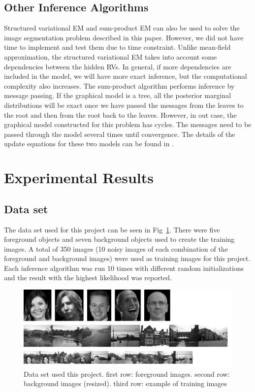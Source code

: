 \documentclass{article} %
\begin{document}
\subsection{Other Inference Algorithms}
Structured variational EM and sum-product EM can also be used to solve the image segmentation problem described in this paper. However, we did not have time to implement and test them due to time constraint. Unlike mean-field approximation, the structured variational EM takes into account some dependencies between the hidden RVs. In general, if more dependencies are included in the model, we will have more exact inference, but the computational complexity also increases. The sum-product algorithm performs inference by message passing. If the graphical model is a tree, all the posterior marginal distributions will be exact once we have passed the messages from the leaves to the root and then from the root back to the leaves. However, in out case, the graphical model constructed for this problem has cycles. The messages need to be passed through the model several times until convergence. The details of the update equations for these two models can be found in \cite{b2}.

\section{Experimental Results}
\label{result}
\subsection{Data set}
\label{data_set}
The data set used for this project can be seen in Fig~\ref{fig:data_set}. There were five foreground objects and seven background objects used to create the training images. A total of 350 images (10 noisy images of each combination of the foreground and background images) were used as training images for this project. Each inference algorithm was run 10 times with different random initializations and the result with the highest likelihood was reported.

\begin{figure}[h]
\begin{center}
\includegraphics[width=1\textwidth]{data_set}
\end{center}
\caption{Data set used this project. first row: foreground images. second row: background images (resized). third row: example of training images}
\label{fig:data_set}
\end{figure}
\end{document}
